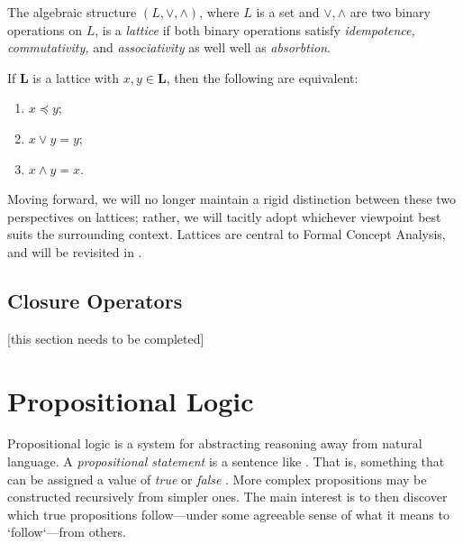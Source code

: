 \begin{definition}
     \label{definition:algebraic-lattice}
The algebraic structure $(L, \vee, \wedge)$, where $L$ is a set and $\vee, \wedge$ are two binary operations on $L$, is a \emph{lattice} if both binary operations satisfy \textit{idempotence, commutativity,} and \textit{associativity} as well well as \textit{absorbtion}.
\end{definition}



\begin{lemma}
  \label{lemma:the-connecting-lemma}
  If $\mathbf{L}$ is a lattice with $x, y \in \mathbf{L}$, then the following are equivalent:
  \begin{enumerate}
      \setlength\itemsep{0pt}
      \setlength\parsep{0pt}
    \item $x \preceq y$;
    \item $x \vee y = y$;
    \item $x \wedge y = x$.
  \end{enumerate}
\end{lemma}

Moving forward, we will no longer maintain a rigid distinction between these two perspectives on lattices; rather, we will tacitly adopt whichever viewpoint best suits the surrounding context. Lattices are central to Formal Concept Analysis, and will be revisited in .

\subsection{Closure Operators}
\label{subsection:closure-operators}
[this section needs to be completed]

\section{Propositional Logic}
\label{section:propositional-logic}

Propositional logic is a system for abstracting reasoning away from natural language. A \textit{propositional statement} is a sentence like . That is, something that can be assigned a value of \textit{true} or \textit{false} \cite[p. 7]{Ben1993Mathematical}. More complex propositions may be constructed recursively from simpler ones. The main interest is to then discover which true propositions follow---under some agreeable sense of what it means to `follow`---from others.

